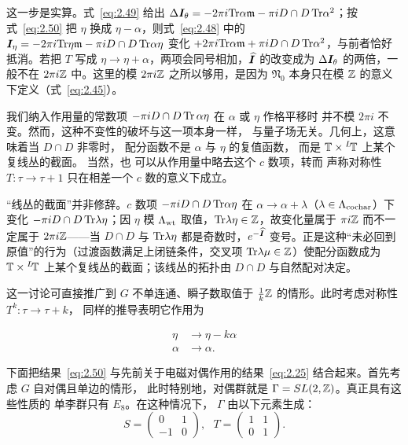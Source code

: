 \begin{yizhu}[含糊点拨]
这一步是实算。式~\eqref{eq:2.49} 给出 $\Delta\bm{I}_\theta=-2\pi i{\rm Tr}\alpha{\mathfrak m}-\pi iD\cap D\,{\rm Tr}\alpha^2$；按式~\eqref{eq:2.50} 把 $\eta$ 换成 $\eta-\alpha$，则式~\eqref{eq:2.48} 中的 $\bm{I}_\eta=-2\pi i{\rm Tr}\eta{\mathfrak m}-\pi iD\cap D\,{\rm Tr}\alpha\eta$ 变化 $+2\pi i{\rm Tr}\alpha{\mathfrak m}+\pi iD\cap D\,{\rm Tr}\alpha^2$，与前者恰好抵消。若把 $T$ 写成 $\eta\to\eta+\alpha$，两项会同号相加，$\widehat{\bm{I}}$ 的改变成为 $\Delta\bm{I}_\theta$ 的两倍，一般不在 $2\pi i{\mathbb{Z}}$ 中。这里的模 $2\pi i{\mathbb{Z}}$ 之所以够用，是因为 ${\mathfrak N}_0$ 本身只在模 ${\mathbb{Z}}$ 的意义下定义（式~\eqref{eq:2.45}）。
\end{yizhu}

我们纳入作用量的常数项 $-\pi i  D\cap D\,{\rm Tr}\,\alpha\eta$ 在 $\alpha$ 或 $\eta$ 作格平移时
并不模 $2\pi i$ 不变。然而，这种不变性的破坏与这一项本身一样，
与量子场无关。几何上，这意味着当 $D\cap D$ 非零时，
配分函数不是 $\alpha$ 与 $\eta$ 的复值函数，
而是 ${\mathbb{T}}\times
{}^L\negthinspace{\mathbb{T}}$ 上某个复线丛的截面。
  当然，也
可以从作用量中略去这个 $c$ 数项，转而
声称对称性 $T:\tau\to\tau+1$ 只在相差一个
$c$ 数的意义下成立。

\begin{yizhu}[易错点]
“线丛的截面”并非修辞。$c$ 数项 $-\pi iD\cap D\,{\rm Tr}\alpha\eta$ 在 $\alpha\to\alpha+\lambda$（$\lambda\in\Lambda_{\rm cochar}$）下变化 $-\pi iD\cap D\,{\rm Tr}\lambda\eta$；因 $\eta$ 模 $\Lambda_{\rm wt}$ 取值，${\rm Tr}\lambda\eta\in{\mathbb{Z}}$，故变化量属于 $\pi i{\mathbb{Z}}$ 而不一定属于 $2\pi i{\mathbb{Z}}$——当 $D\cap D$ 与 ${\rm Tr}\lambda\eta$ 都是奇数时，$e^{-\widehat{\bm{I}}}$ 变号。正是这种“未必回到原值”的行为（过渡函数满足上闭链条件，交叉项 ${\rm Tr}\lambda\mu\in{\mathbb{Z}}$）使配分函数成为 ${\mathbb{T}}\times{}^L\negthinspace{\mathbb{T}}$ 上某个复线丛的截面；该线丛的拓扑由 $D\cap D$ 与自然配对决定。
\end{yizhu}

这一讨论可直接推广到 $G$ 不单连通、瞬子数取值于
${1\over k}{\mathbb{Z}}$ 的情形。此时考虑对称性 $T^k:\tau\to\tau+k$，
同样的推导表明它作用为

\setcounter{equation}{50}
\begin{equation}\label{eq:2.51}
  \begin{aligned}\eta&\to\eta-k\alpha\\ \alpha&\to
\alpha.\end{aligned}
\end{equation}


下面把结果~\eqref{eq:2.50} 与先前关于电磁对偶作用的结果~\eqref{eq:2.25}
结合起来。首先考虑 $G$ 自对偶且单边的情形，
此时特别地，对偶群就是 $\Gamma=SL(2,{\mathbb{Z}})$。真正具有这些性质的
单李群只有 $E_8$。在这种情况下，
$\Gamma$ 由以下元素生成：
\setcounter{equation}{51}
\begin{equation}\label{eq:2.52}
  S=\left(\begin{matrix}0&
1\\ -1& 0\end{matrix}\right), ~~~T=\left(\begin{matrix}1&1\\ 0&1\end{matrix}\right).
\end{equation}

